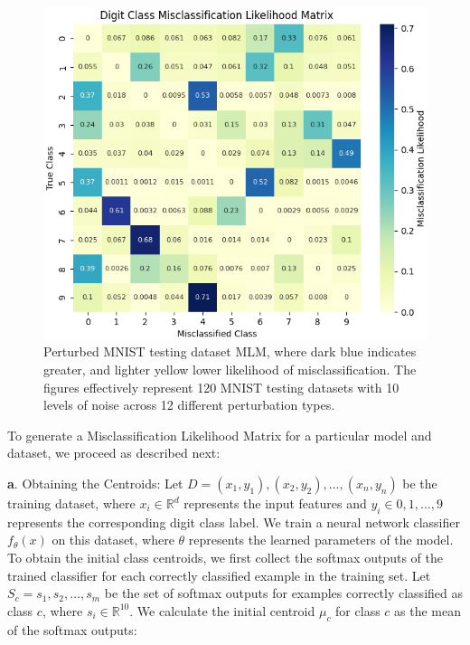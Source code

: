 \begin{figure}[h]
    \centering
    \includegraphics[width=0.99\columnwidth]{Figures/DigitClassMisclassificationLikelihoodMatrix.png}   %
    \caption{Perturbed MNIST testing dataset MLM, where dark blue indicates greater, and lighter yellow lower likelihood of misclassification. The figures effectively represent 120 MNIST testing datasets with 10 levels of noise across 12 different perturbation types.} 
    \label{fig:DigitClassMisclassificationLikelihoodMatrix}
\end{figure}

To generate a Misclassification Likelihood Matrix for a particular model and dataset, we proceed as described next:

\textbf{a}. Obtaining the Centroids:
Let $ D = {(x_1, y_1), (x_2, y_2), ..., (x_n, y_n)} $ be the training dataset, where $ x_i \in \mathbb{R}^d $ represents the input features and $y_i \in {0, 1, ..., 9}$ represents the corresponding digit class label. We train a neural network classifier $f_\theta(x)$ on this dataset, where $\theta$ represents the learned parameters of the model.
To obtain the initial class centroids, we first collect the softmax outputs of the trained classifier for each correctly classified example in the training set. Let $S_c = {s_1, s_2, ..., s_m}$ be the set of softmax outputs for examples correctly classified as class $c$, where $s_i \in \mathbb{R}^{10}$. We calculate the initial centroid $\mu_c$ for class $c$ as the mean of the softmax outputs:


